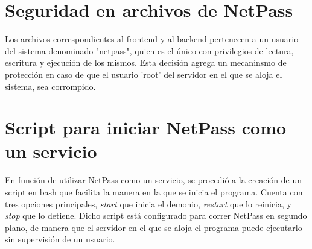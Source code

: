 \section{Seguridad en archivos de NetPass} \label{sect:Seguridad en archivos de NetPass}
		Los archivos correspondientes al frontend y al backend pertenecen a un usuario del sistema denominado "netpass", quien es el único con privilegios de lectura, escritura y ejecución de los mismos. Esta decisión agrega un mecaninsmo de protección en caso de que el usuario 'root' del servidor en el que se aloja el sistema, sea corrompido.

\section{Script para iniciar NetPass como un servicio} \label{sect:Script para iniciar NetPass como un servicio}
		En función de utilizar NetPass como un servicio, se procedió a la creación de un script en bash que facilita la manera en la que se inicia el programa. Cuenta con tres opciones principales, \textit{start} que inicia el demonio, \textit{restart} que lo reinicia, y \textit{stop} que lo detiene. Dicho script está configurado para correr NetPass en segundo plano, de manera que el servidor en el que se aloja el programa puede ejecutarlo sin supervisión de un usuario.
